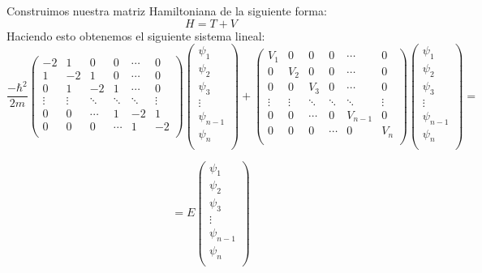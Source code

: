 \documentclass{article}
\begin{document}
Construimos nuestra matriz Hamiltoniana de la siguiente forma:
\begin{equation}
	H=T+V
\end{equation}
Haciendo esto obtenemos el siguiente sistema lineal: \\

\begin{equation*}
	\frac{-\hbar^2}{2m} \left(
	\begin{matrix}
		-2 & 1 & 0 & 0 &  \cdots & 0 \\
		1 & -2 & 1 & 0 & \cdots & 0\\
		0 & 1 & -2 & 1 & \cdots & 0\\
		\vdots & \vdots&\ddots &\ddots &\ddots& \vdots \\
		0 & 0   &\cdots &1& -2 & 1 \\
		0 & 0 & 0  &\cdots & 1 & -2 \\
	\end{matrix}
	\right)
	\left(
	\begin{matrix}
		\psi_1 \\
		\psi_2 \\
		\psi_3 \\
		\vdots\\
		\psi_{n-1} \\
		\psi_{n} \\
	\end{matrix}
	\right)
		+
	\left(
	\begin{matrix}
		V_1 & 0 & 0 & 0 &  \cdots & 0 \\
		0 & V_2 & 0 & 0 & \cdots & 0\\
		0 & 0 & V_3 & 0 & \cdots & 0\\
		\vdots & \vdots&\ddots &\ddots &\ddots& \vdots \\
		0 & 0   &\cdots &0& V_{n-1} & 0 \\
		0 & 0 & 0  &\cdots & 0 & V_{n} \\
	\end{matrix}
	\right)
	\left(
	\begin{matrix}
		\psi_1 \\
		\psi_2 \\
		\psi_3 \\
		\vdots\\
		\psi_{n-1} \\
		\psi_{n} \\
	\end{matrix}
	\right)	
	=
\end{equation*}

\begin{equation}
	=
	E
	\left(
	\begin{matrix}
		\psi_1 \\
		\psi_2 \\
		\psi_3 \\
		\vdots\\
		\psi_{n-1} \\
		\psi_{n} \\
	\end{matrix}
	\right)
\end{equation} \\
	
\end{document}

